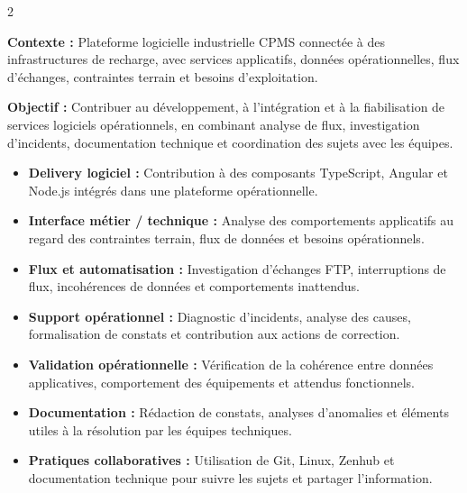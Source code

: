 \documentclass[8pt,a4paper,ragged2e,withhyper]{altacv}
\begin{document}



\makecvheader
\vspace{-0.3cm}


\begin{paracol}{2}



\textbf{Contexte :} Plateforme logicielle industrielle CPMS connectée à des infrastructures de recharge, avec services applicatifs, données opérationnelles, flux d’échanges, contraintes terrain et besoins d’exploitation.

\textbf{Objectif :} Contribuer au développement, à l’intégration et à la fiabilisation de services logiciels opérationnels, en combinant analyse de flux, investigation d’incidents, documentation technique et coordination des sujets avec les équipes.

\begin{itemize}
  \item \textbf{Delivery logiciel :} Contribution à des composants TypeScript, Angular et Node.js intégrés dans une plateforme opérationnelle.
  \item \textbf{Interface métier / technique :} Analyse des comportements applicatifs au regard des contraintes terrain, flux de données et besoins opérationnels.
  \item \textbf{Flux et automatisation :} Investigation d’échanges FTP, interruptions de flux, incohérences de données et comportements inattendus.
  \item \textbf{Support opérationnel :} Diagnostic d’incidents, analyse des causes, formalisation de constats et contribution aux actions de correction.
  \item \textbf{Validation opérationnelle :} Vérification de la cohérence entre données applicatives, comportement des équipements et attendus fonctionnels.
  \item \textbf{Documentation :} Rédaction de constats, analyses d’anomalies et éléments utiles à la résolution par les équipes techniques.
  \item \textbf{Pratiques collaboratives :} Utilisation de Git, Linux, Zenhub et documentation technique pour suivre les sujets et partager l’information.
\end{itemize}


\end{paracol}
\end{document}
